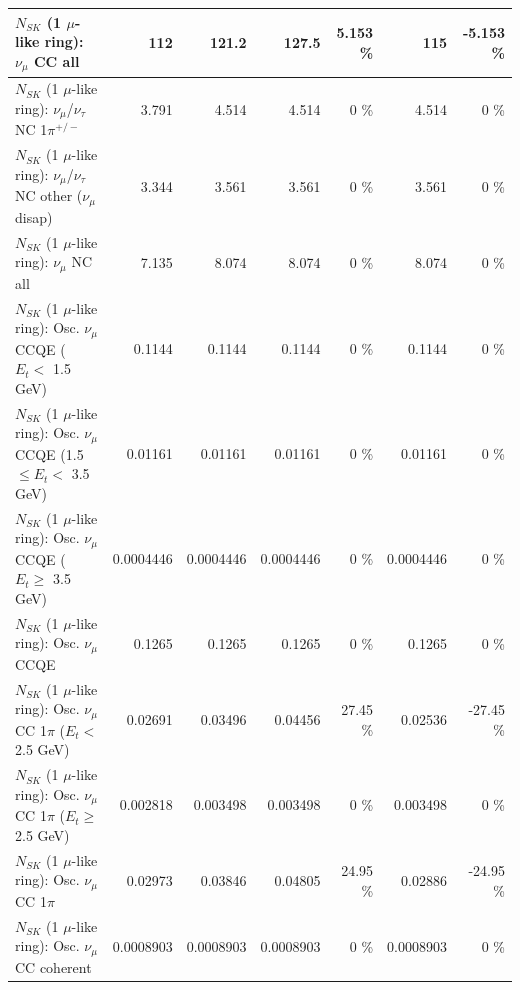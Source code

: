 \begin{table}
\begin{tabular}{| l | r | r | r  r | r  r |}
                                $N_{SK}$ (1 $\mu$-like ring): $\nu_{\mu}$ CC all &             112 &           121.2 &           127.5 &    5.153 \%  &             115 &   -5.153 \%  \\ 
\hline
              $N_{SK}$ (1 $\mu$-like ring): $\nu_\mu$/$\nu_\tau$ NC 1$\pi^{+/-}$ &           3.791 &           4.514 &           4.514 &        0 \%  &           4.514 &        0 \%  \\ 
   $N_{SK}$ (1 $\mu$-like ring): $\nu_\mu$/$\nu_\tau$ NC other ($\nu_\mu$ disap) &           3.344 &           3.561 &           3.561 &        0 \%  &           3.561 &        0 \%  \\ 
                                $N_{SK}$ (1 $\mu$-like ring): $\nu_{\mu}$ NC all &           7.135 &           8.074 &           8.074 &        0 \%  &           8.074 &        0 \%  \\ 
\hline
\hline
           $N_{SK}$ (1 $\mu$-like ring): Osc. $\nu_\mu$ CCQE ($E_{t} <$ 1.5 GeV) &          0.1144 &          0.1144 &          0.1144 &        0 \%  &          0.1144 &        0 \%  \\ 
  $N_{SK}$ (1 $\mu$-like ring): Osc. $\nu_\mu$ CCQE (1.5 $\leq E_{t} <$ 3.5 GeV) &         0.01161 &         0.01161 &         0.01161 &        0 \%  &         0.01161 &        0 \%  \\ 
        $N_{SK}$ (1 $\mu$-like ring): Osc. $\nu_\mu$ CCQE ($E_{t} \geq$ 3.5 GeV) &       0.0004446 &       0.0004446 &       0.0004446 &        0 \%  &       0.0004446 &        0 \%  \\ 
\hline
                               $N_{SK}$ (1 $\mu$-like ring): Osc. $\nu_\mu$ CCQE &          0.1265 &          0.1265 &          0.1265 &        0 \%  &          0.1265 &        0 \%  \\ 
\hline
      $N_{SK}$ (1 $\mu$-like ring): Osc. $\nu_\mu$ CC 1$\pi$ ($E_{t} <$ 2.5 GeV) &         0.02691 &         0.03496 &         0.04456 &    27.45 \%  &         0.02536 &   -27.45 \%  \\ 
   $N_{SK}$ (1 $\mu$-like ring): Osc. $\nu_\mu$ CC 1$\pi$ ($E_{t} \geq$ 2.5 GeV) &        0.002818 &        0.003498 &        0.003498 &        0 \%  &        0.003498 &        0 \%  \\ 
\hline
                          $N_{SK}$ (1 $\mu$-like ring): Osc. $\nu_\mu$ CC 1$\pi$ &         0.02973 &         0.03846 &         0.04805 &    24.95 \%  &         0.02886 &   -24.95 \%  \\ 
                        $N_{SK}$ (1 $\mu$-like ring): Osc. $\nu_\mu$ CC coherent &       0.0008903 &       0.0008903 &       0.0008903 &        0 \%  &       0.0008903 &        0 \%  \\ 

\end{tabular}
\end{table}
